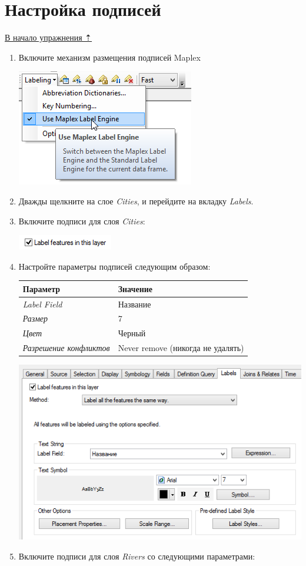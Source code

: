 \documentclass[]{book}
\theoremstyle{definition}
\theoremstyle{definition}
\theoremstyle{definition}
\theoremstyle{remark}
\begin{document}
\hypertarget{map-design-climates-labels}{%
\section{Настройка подписей}\label{map-design-climates-labels}}

\protect\hyperlink{map-design-climates}{В начало упражнения ⇡}

\begin{enumerate}
\def\labelenumi{\arabic{enumi}.}
\item
  Включите механизм размещения подписей Maplex

  \includegraphics{images/Ex03/image26.png}
\item
  Дважды щелкните на слое \emph{Cities}, и перейдите на вкладку
  \emph{Labels}.
\item
  Включите подписи для слоя \emph{Cities}:

  \includegraphics{images/Ex03/image27.png}
\item
  Настройте параметры подписей следующим образом:

  \begin{longtable}[]{@{}ll@{}}
  \toprule
  \textbf{Параметр} & \textbf{Значение}\tabularnewline
  \midrule
  \endhead
  \emph{Label Field} & Название\tabularnewline
  \emph{Размер} & 7\tabularnewline
  \emph{Цвет} & Черный\tabularnewline
  \emph{Разрешение конфликтов} & Never remove (никогда не
  удалять)\tabularnewline
  \bottomrule
  \end{longtable}

  \includegraphics{images/Ex03/image28.png}
\item
  Включите подписи для слоя \emph{Rivers} со следующими параметрами:


\end{enumerate}
\end{document}
